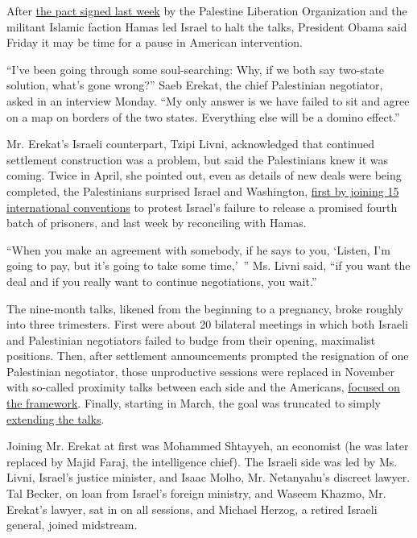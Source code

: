 After
\href{http://www.nytimes.com/2014/04/24/world/middleeast/palestinian-factions-announce-deal-on-unity-government.html?hpw\&rref=world}{the
pact signed last week} by the Palestine Liberation Organization and the
militant Islamic faction Hamas led Israel to halt the talks, President
Obama said Friday it may be time for a pause in American intervention.

``I've been going through some soul-searching: Why, if we both say
two-state solution, what's gone wrong?'' Saeb Erekat, the chief
Palestinian negotiator, asked in an interview Monday. ``My only answer
is we have failed to sit and agree on a map on borders of the two
states. Everything else will be a domino effect.''

Mr. Erekat's Israeli counterpart, Tzipi Livni, acknowledged that
continued settlement construction was a problem, but said the
Palestinians knew it was coming. Twice in April, she pointed out, even
as details of new deals were being completed, the Palestinians surprised
Israel and Washington,
\href{http://www.nytimes.com/2014/04/02/world/middleeast/jonathan-pollard.html}{first
by joining 15 international conventions} to protest Israel's failure to
release a promised fourth batch of prisoners, and last week by
reconciling with Hamas.

``When you make an agreement with somebody, if he says to you, `Listen,
I'm going to pay, but it's going to take some time,'~'' Ms. Livni said,
``if you want the deal and if you really want to continue negotiations,
you wait.''

The nine-month talks, likened from the beginning to a pregnancy, broke
roughly into three trimesters. First were about 20 bilateral meetings in
which both Israeli and Palestinian negotiators failed to budge from
their opening, maximalist positions. Then, after settlement
announcements prompted the resignation of one Palestinian negotiator,
those unproductive sessions were replaced in November with so-called
proximity talks between each side and the Americans,
\href{http://www.nytimes.com/2014/01/01/world/middleeast/kerry-to-press-for-framework-accord-to-keep-mideast-peace-effort-moving.html}{focused
on the framework}. Finally, starting in March, the goal was truncated to
simply
\href{http://www.nytimes.com/2014/04/05/world/middleeast/mideast.html}{extending
the talks}.

Joining Mr. Erekat at first was Mohammed Shtayyeh, an economist (he was
later replaced by Majid Faraj, the intelligence chief). The Israeli side
was led by Ms. Livni, Israel's justice minister, and Isaac Molho, Mr.
Netanyahu's discreet lawyer. Tal Becker, on loan from Israel's foreign
ministry, and Waseem Khazmo, Mr. Erekat's lawyer, sat in on all
sessions, and Michael Herzog, a retired Israeli general, joined
midstream.

